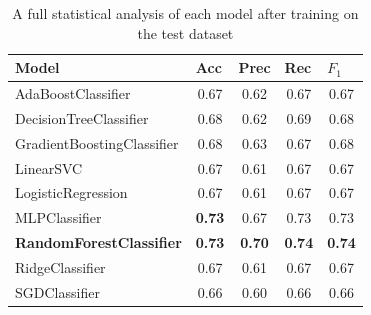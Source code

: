 \documentclass[12pt,a4paper]{article}
\begin{document}
\begin{table}[htb]
\centering
\caption{A full statistical analysis of each model after training on the test dataset}
\label{table:results_explore}
\begin{tabular}{|p{5cm}|c|c|c|c|}
\hline
\textbf{Model}                  & \multicolumn{1}{l|}{\textbf{Acc}} & \multicolumn{1}{l|}{\textbf{Prec}} & \multicolumn{1}{l|}{\textbf{Rec}} & \multicolumn{1}{l|}{\textbf{$F_1$}} \\ \hline
AdaBoostClassifier              & 0.67                              & 0.62                               & 0.67                              & 0.67                               \\ \hline
DecisionTreeClassifier          & 0.68                              & 0.62                               & 0.69                              & 0.68                               \\ \hline
GradientBoostingClassifier      & 0.68                              & 0.63                               & 0.67                              & 0.68                               \\ \hline
LinearSVC                       & 0.67                              & 0.61                               & 0.67                              & 0.67                               \\ \hline
LogisticRegression              & 0.67                              & 0.61                               & 0.67                              & 0.67                               \\ \hline
MLPClassifier                   &\textbf{0.73}                              & 0.67                               & 0.73                              & 0.73                               \\ \hline
\textbf{RandomForestClassifier} & \textbf{0.73}                     & \textbf{0.70}                      & \textbf{0.74}                     & \textbf{0.74}                      \\ \hline
RidgeClassifier                 & 0.67                              & 0.61                               & 0.67                              & 0.67                               \\ \hline
SGDClassifier                   & 0.66                              & 0.60                               & 0.66                              & 0.66                               \\ \hline
\end{tabular}
\end{table}
\end{document}
